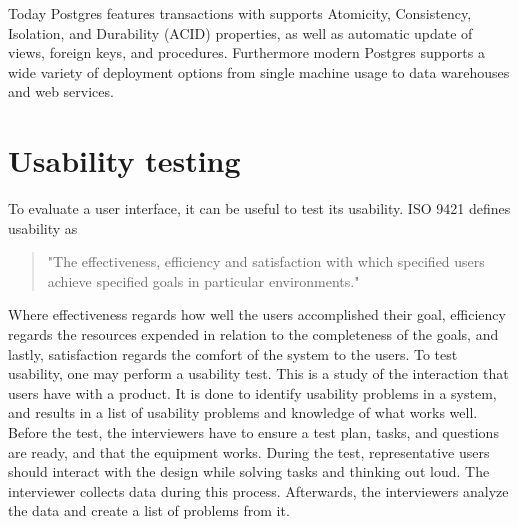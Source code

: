 Today Postgres features transactions with supports Atomicity, Consistency, Isolation, and Durability (ACID) properties, as well as automatic update of views, foreign keys, and procedures. 
Furthermore modern Postgres supports a wide variety of deployment options from single machine usage to data warehouses and web services\cite{Postgres_Docs}.

\section*{Usability testing}
To evaluate a user interface, it can be useful to test its usability. ISO 9421 defines usability as
\begin{quote}
	"The effectiveness, efficiency and satisfaction with which specified users achieve specified goals in particular environments."
\end{quote}

Where effectiveness regards how well the users accomplished their goal, efficiency regards the resources expended in relation to the completeness of the goals, and lastly, satisfaction regards the comfort of the system to the users.
To test usability, one may perform a usability test. This is a study of the interaction that users have with a product. It is done to identify usability problems in a system, and results in a list of usability problems and knowledge of what works well.
Before the test, the interviewers have to ensure a test plan, tasks, and questions are ready, and that the equipment works.
During the test, representative users should interact with the design while solving tasks and thinking out loud. The interviewer collects data during this process.
Afterwards, the interviewers analyze the data and create a list of problems from it.
\cite{deb7}